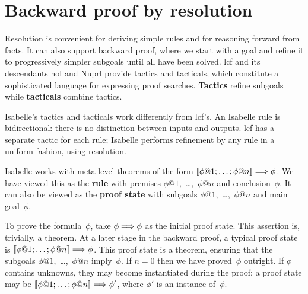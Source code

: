 \section{Backward proof by resolution}

Resolution is convenient for deriving simple rules and for reasoning
forward from facts.  It can also support backward proof, where we start
with a goal and refine it to progressively simpler subgoals until all have
been solved.  {\sc lcf} and its descendants {\sc hol} and Nuprl provide
tactics and tacticals, which constitute a sophisticated language for
expressing proof searches.  {\bf Tactics} refine subgoals while {\bf
  tacticals} combine tactics.

Isabelle's tactics and tacticals work differently from {\sc lcf}'s.  An
Isabelle rule is bidirectional: there is no distinction between
inputs and outputs.  {\sc lcf} has a separate tactic for each rule;
Isabelle performs refinement by any rule in a uniform fashion, using
resolution.

Isabelle works with meta-level theorems of the form
\( \List{\phi@1; \ldots; \phi@n} \Imp \phi \).
We have viewed this as the {\bf rule} with premises
$\phi@1$,~\ldots,~$\phi@n$ and conclusion~$\phi$.  It can also be viewed as
the {\bf proof state}
with subgoals $\phi@1$,~\ldots,~$\phi@n$ and main
goal~$\phi$.

To prove the formula~$\phi$, take $\phi\Longrightarrow \phi$ as the initial proof
state.  This assertion is, trivially, a theorem.  At a later stage in the
backward proof, a typical proof state is $\List{\phi@1; \ldots; \phi@n}
\Imp \phi$.  This proof state is a theorem, ensuring that the subgoals
$\phi@1$,~\ldots,~$\phi@n$ imply~$\phi$.  If $n=0$ then we have
proved~$\phi$ outright.  If $\phi$ contains unknowns, they may become
instantiated during the proof; a proof state may be $\List{\phi@1; \ldots;
\phi@n} \Imp \phi'$, where $\phi'$ is an instance of~$\phi$.

